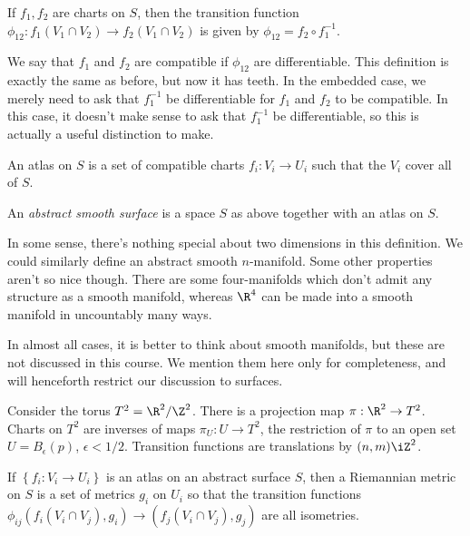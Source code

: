 If $f_1,f_2$ are charts on $S$, then the transition function $\phi_{12}:f_1(V_1 \cap V_2) \to f_2(V_1 \cap V_2)$ is given by $\phi_{12} = f_2 \circ f_1^{-1}$.

We say that $f_1$ and $f_2$ are compatible if $\phi_{12}$ are differentiable. This definition is exactly the same as before, but now it has teeth. In the embedded case, we merely need to ask that $f_1^{-1}$ be differentiable for $f_1$ and $f_2$ to be compatible. In this case, it doesn't make sense to ask that $f_1^{-1}$ be differentiable, so this is actually a useful distinction to make.

An atlas on $S$ is a set of compatible charts $f_i:V_i \to U_i$ such that the $V_i$ cover all of $S$.

\begin{definition}
	An \emph{abstract smooth surface} is a space $S$ as above together with an atlas on $S$.
\end{definition}

In some sense, there's nothing special about two dimensions in this definition. We could similarly define an abstract smooth $n$-manifold. Some other properties aren't so nice though. There are some four-manifolds which don't admit any structure as a smooth manifold, whereas $\R^4$ can be made into a smooth manifold in uncountably many ways.

In almost all cases, it is better to think about smooth manifolds, but these are not discussed in this course. We mention them here only for completeness, and will henceforth restrict our discussion to surfaces.

\begin{example}
	Consider the torus $T^2=\R^2/\Z^2$. There is a projection map $\pi:\R^2\to T^2$.
	Charts on $T^2$ are inverses of maps $\pi_U:U \to T^2$, the restriction of $\pi$ to an open set $U=B_\epsilon(p)$, $\epsilon<1/2$.
	Transition functions are translations by $(n,m)\iZ^2$.
\end{example}

\begin{definition}
	If $\left\{f_i:V_i \to U_i\right\}$ is an atlas on an abstract surface $S$, then a Riemannian metric on $S$ is a set of metrics $g_i$ on $U_i$ so that the transition functions $\phi_{ij}(f_i(V_i \cap V_j), g_i) \to (f_j(V_i \cap V_j), g_j)$ are all isometries.
\end{definition}

